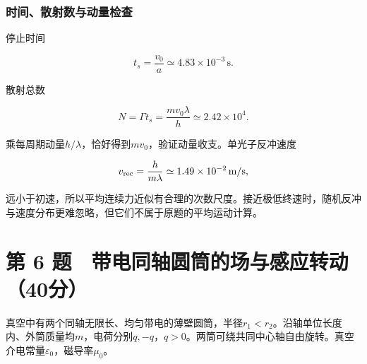 \documentclass[12pt,a4paper,fontset=fandol]{ctexart}
\begin{document}
\par\noindent\begin{minipage}{\linewidth}
\subsubsection{时间、散射数与动量检查}\label{ux65f6ux95f4ux6563ux5c04ux6570ux4e0eux52a8ux91cfux68c0ux67e5}

停止时间

\[
t_s=\frac{v_0}{a}\simeq4.83\times10^{-3}\,\mathrm s.
\]

散射总数

\[
N=\Gamma t_s=\frac{m v_0\lambda}{h}
\simeq2.42\times10^4.
\]

乘每周期动量\(h/\lambda\)，恰好得到\(m v_0\)，验证动量收支。单光子反冲速度

\[
v_{\rm rec}=\frac{h}{m\lambda}
\simeq1.49\times10^{-2}\,\mathrm{m/s},
\]

远小于初速，所以平均连续力近似有合理的次数尺度。接近极低终速时，随机反冲与速度分布更难忽略，但它们不属于原题的平均运动计算。

\end{minipage}\par
\clearpage

\section{第 6
题　带电同轴圆筒的场与感应转动（40分）}\label{ux7b2c-6-ux9898-ux5e26ux7535ux540cux8f74ux5706ux7b52ux7684ux573aux4e0eux611fux5e94ux8f6cux52a840ux5206}

真空中有两个同轴无限长、均匀带电的薄壁圆筒，半径\(r_1<r_2\)。沿轴单位长度内、外筒质量均\(m\)，电荷分别\(q,-q\)，\(q>0\)。两筒可绕共同中心轴自由旋转。真空介电常量\(\varepsilon_0\)，磁导率\(\mu_0\)。

\begin{center}
\begin{minipage}{\linewidth}
\centering\begingroup{}
\ifdim\wd\diagrambox>.88\linewidth
\sbox{\diagrambox}{\resizebox{.88\linewidth}{!}{\usebox{\diagrambox}}}\fi
\ifdim\ht\diagrambox>.38\textheight
\resizebox{!}{.38\textheight}{\usebox{\diagrambox}}
\else\usebox{\diagrambox}\fi
\par{}\endgroup\end{minipage}\end{center}
\end{document}
